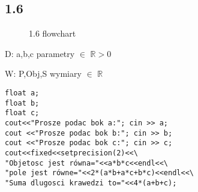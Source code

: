 \documentclass[a4paper,11pt]{article}
\begin{document}
\subsection*{1.6}
\begin{multicols}{2}
  \begin{flushleft}
    \begin{figure}[H]
    \centering  
{}
    \caption{1.6 flowchart}
    \label{flow6}
\end{figure}
    \end{flushleft}
 D: a,b,c parametry $\in$ $\mathbb{R}>0$
 
 W: P,Obj,S wymiary $\in$ $\mathbb{R}$
    \begin{flushright}
    \begin{verbatim}
float a;
float b;
float c;
cout<<"Prosze podac bok a:"; cin >> a;
cout <<"Prosze podac bok b:"; cin >> b;
cout <<"Prosze podac bok c:"; cin >> c;
cout<<fixed<<setprecision(2)<<\
"Objetosc jest równa="<<a*b*c<<endl<<\
"pole jest równe="<<2*(a*b+a*c+b*c)<<endl<<\
"Suma dlugosci krawedzi to="<<4*(a+b+c);
\end{verbatim}
    \end{flushright}
\end{multicols}

\pagebreak
\end{document}
